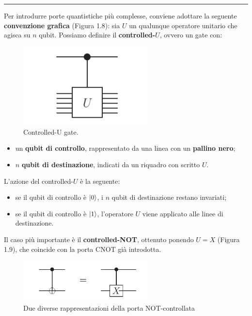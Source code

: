 \documentclass[a4paper,12pt]{report}
\theoremstyle{plain}
\begin{document}
\noindent\rule{\textwidth}{0.4pt}
\vspace{1em}
Per introdurre porte quantistiche più complesse, conviene adottare la seguente \textbf{convenzione grafica} (Figura 1.8): sia $U$ un qualunque operatore unitario che agisca su $n$ qubit. Possiamo definire il \textbf{controlled-$U$}, ovvero un gate con:
\begin{figure}[H]
    \centering
    \includegraphics[width=0.6\textwidth]{Immagine7.png} 
    \caption{Controlled-U gate.}
    \label{Immagine7}
\end{figure}
\begin{itemize}
    \item un \textbf{qubit di controllo}, rappresentato da una linea con un \textbf{pallino nero};
    \item $n$ \textbf{qubit di destinazione}, indicati da un riquadro con scritto $U$.
\end{itemize}
L'azione del controlled-$U$ è la seguente:
\begin{itemize}
    \item se il qubit di controllo è $\ket{0}$, i $n$ qubit di destinazione restano invariati;
    \item se il qubit di controllo è $\ket{1}$, l'operatore $U$ viene applicato alle linee di destinazione.
\end{itemize}
Il caso più importante è il \textbf{controlled-NOT}, ottenuto ponendo $U = X$ (Figura 1.9), che coincide con la porta CNOT già introdotta.
\begin{figure}[H]
    \centering
    \includegraphics[width=0.6\textwidth]{Immagine8.png} 
    \caption{Due diverse rappresentazioni della porta NOT-controllata}
    \label{Immagine8}
\end{figure}
\end{document}
